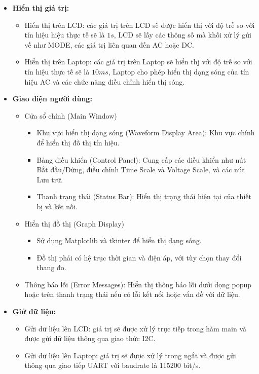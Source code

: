 \begin{enumerate}[label=\alph*)]
\begin{itemize}[label=-]
		\item \textbf{Hiển thị giá trị:}
		\begin{itemize}[label=+]
			\item Hiển thị trên LCD: các giá trị trên LCD sẽ được hiển thị với độ trễ so với tín hiệu hiệu thực tế sẽ là $1s$, LCD sẽ lấy các thông số mà khối xử lý gửi về như MODE, các giá trị liên quan đến AC hoặc DC.
			\item Hiển thị trên Laptop: các giá trị trên Laptop sẽ hiển thj với độ trễ so với tín hiệu thực tế sẽ là $10ms$, Laptop cho phép hiển thị dạng sóng của tín hiệu AC và các chức năng điều chỉnh hiển thị sóng.
		\end{itemize}
		\item \textbf{Giao diện người dùng:}
		\begin{itemize}[label=+]
			\item Cửa sổ chính (Main Window)
			\begin{itemize}
				\item Khu vực hiển thị dạng sóng (Waveform Display Area): Khu vực chính để hiển thị đồ thị tín hiệu.
				\item Bảng điều khiển (Control Panel): Cung cấp các điều khiển như nút Bắt đầu/Dừng, điều chỉnh Time Scale và Voltage Scale, và các nút Lưu trữ.
				\item Thanh trạng thái (Status Bar): Hiển thị trạng thái hiện tại của thiết bị và kết nối.
			\end{itemize}
			\item Hiển thị đồ thị (Graph Display)
			\begin{itemize}
				\item Sử dụng Matplotlib và tkinter để hiển thị dạng sóng.
				\item Đồ thị phải có hệ trục thời gian và điện áp, với tùy chọn thay đổi thang đo.
			\end{itemize}
			\item Thông báo lỗi (Error Messages): Hiển thị thông báo lỗi dưới dọng popup hoặc trên thanh trạng thái nếu có lỗi kết nối hoặc vấn đề với dữ liệu.
		\end{itemize}
		\item \textbf{Giử dữ liệu:}
		\begin{itemize}[label=+]
			\item Gửi dữ liệu lên LCD: giá trị sẽ được xử lý trực tiếp trong hàm main và được gửi dữ liệu thông qua giao thức I2C.
			\item Gửi dữ liệu lên Laptop: giá trị sẽ được xử lý trong ngắt và được gửi thông qua giao tiếp UART với baudrate là 115200 bit/s.
			

\end{itemize}
\end{itemize}
\end{enumerate}
